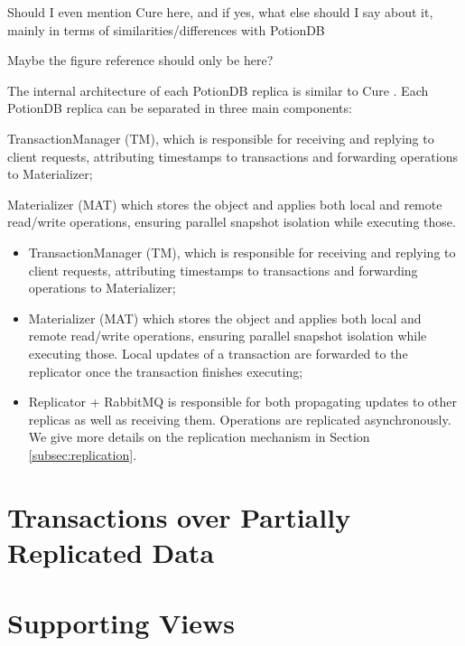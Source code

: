 \documentclass{vldb}
\newcommand{\grumbler}[2]{{\color{red}{\bf #1:} #2}}
\newcommand{\andre}[1]{\grumbler{andre}{#1}}
\begin{document}
\andre{Should I even mention Cure here, and if yes, what else should I say about it, mainly in terms of similarities/differences with PotionDB}

\andre{Maybe the figure reference should only be here?}

The internal architecture of each PotionDB replica is similar to Cure \cite{cure}.
Each PotionDB replica can be separated in three main components:
\begin{enumerate*}[label=(\roman*)]
	\item TransactionManager (TM), which is responsible for receiving and replying to client requests, attributing timestamps to transactions and forwarding operations to Materializer;
	\item Materializer (MAT) which stores the object and applies both local and remote read/write operations, ensuring parallel snapshot isolation while executing those.
\end{enumerate*}

\begin{itemize}
	\item TransactionManager (TM), which is responsible for receiving and replying to client requests, attributing timestamps to transactions and forwarding operations to Materializer;
	\item Materializer (MAT) which stores the object and applies both local and remote read/write operations, ensuring parallel snapshot isolation while executing those.
	Local updates of a transaction are forwarded to the replicator once the transaction finishes executing;
	\item Replicator + RabbitMQ is responsible for both propagating updates to other replicas as well as receiving them. Operations are replicated asynchronously. We give more details on the replication  mechanism in Section \ref{subsec:replication}.
\end{itemize}




\section{Transactions over Partially Replicated Data}


\section{Supporting Views}
\end{document}
